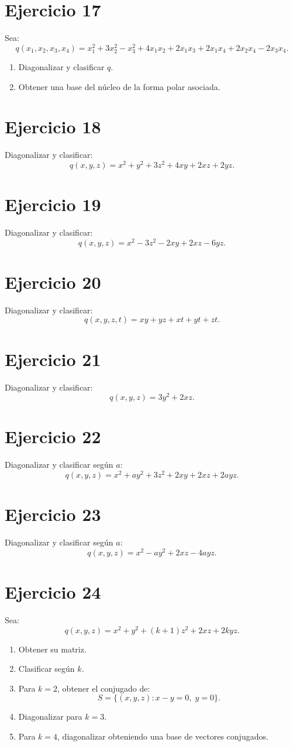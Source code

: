 \documentclass[11pt,a4paper]{article}
\begin{document}
\section{Ejercicio 17}
Sea:
\[
q(x_1,x_2,x_3,x_4)
=
x_1^2+3x_2^2-x_3^2
+4x_1x_2+2x_1x_3+2x_1x_4
+2x_2x_4-2x_3x_4.
\]
\begin{enumerate}[label=\alph*)]
\item Diagonalizar y clasificar $q$.
\item Obtener una base del núcleo de la forma polar asociada.
\end{enumerate}

\section{Ejercicio 18}
Diagonalizar y clasificar:
\[
q(x,y,z)=x^2+y^2+3z^2+4xy+2xz+2yz.
\]

\section{Ejercicio 19}
Diagonalizar y clasificar:
\[
q(x,y,z)=x^2-3z^2-2xy+2xz-6yz.
\]

\section{Ejercicio 20}
Diagonalizar y clasificar:
\[
q(x,y,z,t)=xy+yz+xt+yt+zt.
\]

\section{Ejercicio 21}
Diagonalizar y clasificar:
\[
q(x,y,z)=3y^2+2xz.
\]

\section{Ejercicio 22}
Diagonalizar y clasificar según $a$:
\[
q(x,y,z)=x^2+ay^2+3z^2+2xy+2xz+2ayz.
\]

\section{Ejercicio 23}
Diagonalizar y clasificar según $a$:
\[
q(x,y,z)=x^2-ay^2+2xz-4ayz.
\]

\section{Ejercicio 24}
Sea:
\[
q(x,y,z)=x^2+y^2+(k+1)z^2+2xz+2kyz.
\]
\begin{enumerate}[label=\alph*)]
\item Obtener su matriz.
\item Clasificar según $k$.
\item Para $k=2$, obtener el conjugado de:
\[
S=\{(x,y,z):x-y=0,\;y=0\}.
\]
\item Diagonalizar para $k=3$.
\item Para $k=4$, diagonalizar obteniendo una base de vectores conjugados.
\end{enumerate}
\end{document}
